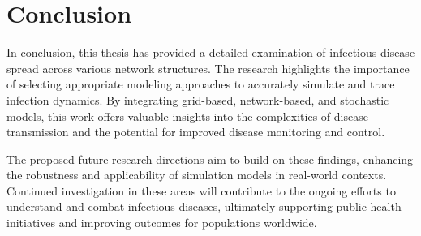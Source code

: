 \section{Conclusion}
In conclusion, this thesis has provided a detailed examination of infectious disease spread across various network structures. The research highlights the importance of selecting appropriate modeling approaches to accurately simulate and trace infection dynamics. By integrating grid-based, network-based, and stochastic models, this work offers valuable insights into the complexities of disease transmission and the potential for improved disease monitoring and control.

The proposed future research directions aim to build on these findings, enhancing the robustness and applicability of simulation models in real-world contexts. Continued investigation in these areas will contribute to the ongoing efforts to understand and combat infectious diseases, ultimately supporting public health initiatives and improving outcomes for populations worldwide.